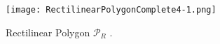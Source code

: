 \begin{figure}[h!]
    \centering
    \texttt{[image: RectilinearPolygonComplete4-1.png]}
    \caption{Rectilinear Polygon $\mathcal P_R$ \cite{1057165}.}
    \label{fig:rectilinear}
\end{figure}
